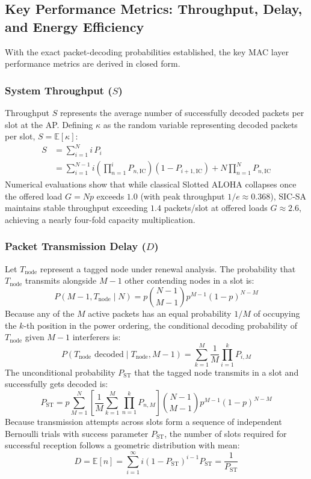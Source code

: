 \subsection{Key Performance Metrics: Throughput, Delay, and Energy Efficiency}
With the exact packet-decoding probabilities established, the key MAC layer performance metrics are derived in closed form.

\subsubsection{System Throughput ($S$)}
Throughput $S$ represents the average number of successfully decoded packets per slot at the AP. Defining $\kappa$ as the random variable representing decoded packets per slot, $S = \mathbb{E}[\kappa]$:
\begin{align}
    S &= \sum_{i=1}^N i \, P_i \nonumber \\
    &= \sum_{i=1}^{N-1} i \left( \prod_{n=1}^i P_{n,\text{IC}} \right) (1 - P_{i+1,\text{IC}}) + N \prod_{n=1}^N P_{n,\text{IC}}
\end{align}
Numerical evaluations show that while classical Slotted ALOHA collapses once the offered load $G = N p$ exceeds $1.0$ (with peak throughput $1/e \approx 0.368$), SIC-SA maintains stable throughput exceeding $1.4$ packets/slot at offered loads $G \approx 2.6$, achieving a nearly four-fold capacity multiplication.

\subsubsection{Packet Transmission Delay ($D$)}
Let $T_{\text{node}}$ represent a tagged node under renewal analysis. The probability that $T_{\text{node}}$ transmits alongside $M - 1$ other contending nodes in a slot is:
\begin{equation}
    P(M - 1, T_{\text{node}} \mid N) = p \binom{N - 1}{M - 1} p^{M - 1} (1 - p)^{N - M}
\end{equation}
Because any of the $M$ active packets has an equal probability $1/M$ of occupying the $k$-th position in the power ordering, the conditional decoding probability of $T_{\text{node}}$ given $M - 1$ interferers is:
\begin{equation}
    P(T_{\text{node}} \text{ decoded} \mid T_{\text{node}}, M - 1) = \sum_{k=1}^M \frac{1}{M} \prod_{i=1}^k P_{i,M}
\end{equation}
The unconditional probability $P_{\text{ST}}$ that the tagged node transmits in a slot and successfully gets decoded is:
\begin{equation}
    P_{\text{ST}} = p \sum_{M=1}^N \left[ \frac{1}{M} \sum_{k=1}^M \prod_{n=1}^k P_{n,M} \right] \binom{N - 1}{M - 1} p^{M - 1} (1 - p)^{N - M}
\end{equation}
Because transmission attempts across slots form a sequence of independent Bernoulli trials with success parameter $P_{\text{ST}}$, the number of slots required for successful reception follows a geometric distribution with mean:
\begin{equation}
    D = \mathbb{E}[n] = \sum_{i=1}^\infty i (1 - P_{\text{ST}})^{i - 1} P_{\text{ST}} = \frac{1}{P_{\text{ST}}}
\end{equation}

